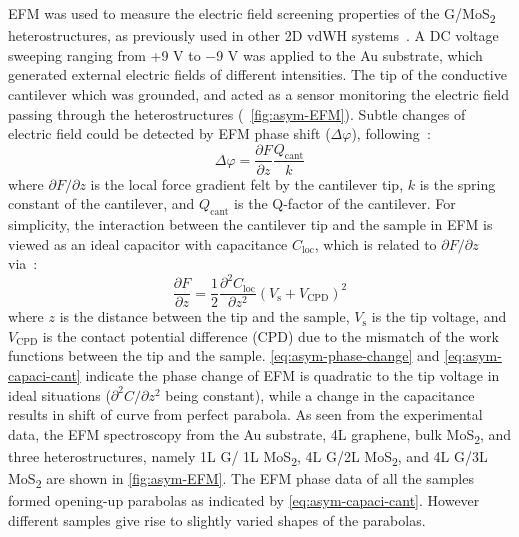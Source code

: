 EFM was used to measure the electric field screening properties of the
G/MoS\textsubscript{2} heterostructures, as previously used in other
2D vdWH
systems~\autocite{Datta_2009_ML_Screening,Castellanos_Gomez_2012_interlayer,Li_2014_screen}.
%
A DC voltage sweeping ranging from +9 V to −9 V was applied to the Au
substrate, which generated external electric fields of different
intensities. The tip of the conductive cantilever which was grounded,
and acted as a sensor monitoring the electric field passing through
the heterostructures (~\autoref{fig:asym-EFM}).
%
Subtle changes of electric field could be detected by EFM phase shift
($\Delta \varphi$), following~\autocite{Li_2014_screen}:
\begin{equation}
  \label{eq:asym-phase-change}
  \Delta \varphi = \frac{\partial F}{\partial z} \frac{Q_{\mathrm{cant}}}{k} 
\end{equation}
where $\partial F/ \partial z$ is the local force gradient felt by the
cantilever tip, $k$ is the spring constant of the cantilever, and $Q_{\mathrm{cant}}$
is the Q-factor of the cantilever.
%
For simplicity, the interaction between the cantilever tip and the
sample in EFM is viewed as an ideal capacitor with capacitance
$C_{\mathrm{loc}}$, which is related to $\partial F/ \partial z$ via~\autocite{Li_2014_screen}:
\begin{equation}
  \label{eq:asym-capaci-cant}
  \frac{\partial F}{\partial z} = \frac{1}{2} \frac{\partial^{2} C_{\mathrm{loc}}}{\partial z^{2}} (V_{\mathrm{s}} + V_{\mathrm{CPD}})^{2}
\end{equation}
where $z$ is the distance between the tip
and the sample, $V_{\mathrm{s}}$ is the tip voltage, and $V_{\mathrm{CPD}}$ is the contact potential difference (CPD) due to the mismatch
of the work functions between the tip and the sample.
%
\autoref{eq:asym-phase-change} and \autoref{eq:asym-capaci-cant}
indicate the phase change of EFM is quadratic to the tip voltage in
ideal situations ($\partial^{2} C / \partial z^{2}$ being constant),
while a change in the capacitance results in shift of curve from perfect parabola.
%
As seen from the experimental data, the EFM spectroscopy from the Au
substrate, 4L graphene, bulk MoS\textsubscript{2}, and three
heterostructures, namely 1L G/ 1L MoS\textsubscript{2}, 4L G/2L
MoS\textsubscript{2}, and 4L G/3L MoS\textsubscript{2} are shown in
\autoref{fig:asym-EFM}.  The EFM phase data of all the samples formed
opening-up parabolas as indicated by \autoref{eq:asym-capaci-cant}.
%
However different
samples give rise to slightly varied shapes of the parabolas.
